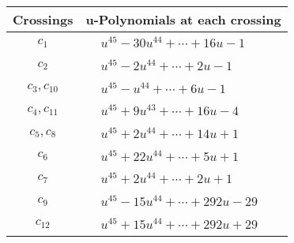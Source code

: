 \documentclass[1p]{elsarticle_modified}
\theoremstyle{definition}
\begin{document}
\begin{tabular}{m{50pt}|m{274pt}}
Crossings & \hspace{64pt}u-Polynomials at each crossing \\
\hline $$\begin{aligned}c_{1}\end{aligned}$$&$\begin{aligned}
&u^{45}-30 u^{44}+\cdots+16 u-1
\end{aligned}$\\
\hline $$\begin{aligned}c_{2}\end{aligned}$$&$\begin{aligned}
&u^{45}-2 u^{44}+\cdots+2 u-1
\end{aligned}$\\
\hline $$\begin{aligned}c_{3},c_{10}\end{aligned}$$&$\begin{aligned}
&u^{45}- u^{44}+\cdots+6 u-1
\end{aligned}$\\
\hline $$\begin{aligned}c_{4},c_{11}\end{aligned}$$&$\begin{aligned}
&u^{45}+9 u^{43}+\cdots+16 u-4
\end{aligned}$\\
\hline $$\begin{aligned}c_{5},c_{8}\end{aligned}$$&$\begin{aligned}
&u^{45}+2 u^{44}+\cdots+14 u+1
\end{aligned}$\\
\hline $$\begin{aligned}c_{6}\end{aligned}$$&$\begin{aligned}
&u^{45}+22 u^{44}+\cdots+5 u+1
\end{aligned}$\\
\hline $$\begin{aligned}c_{7}\end{aligned}$$&$\begin{aligned}
&u^{45}+2 u^{44}+\cdots+2 u+1
\end{aligned}$\\
\hline $$\begin{aligned}c_{9}\end{aligned}$$&$\begin{aligned}
&u^{45}-15 u^{44}+\cdots+292 u-29
\end{aligned}$\\
\hline $$\begin{aligned}c_{12}\end{aligned}$$&$\begin{aligned}
&u^{45}+15 u^{44}+\cdots+292 u+29
\end{aligned}$\\
\hline
\end{tabular}\\~\\
\end{document}

